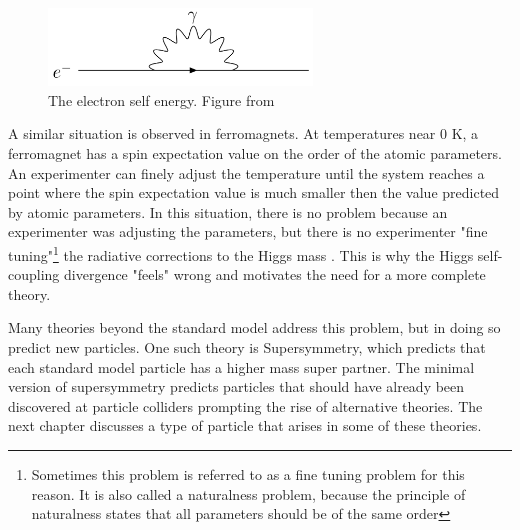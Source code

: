 \begin{figure}[htb]
    \centering
    \includegraphics[width=7cm]{electronSelfE.png}
    \caption{The electron self energy. Figure from \cite{SusyHiggsSelfE}}
    \label{electronSelfE}
\end{figure}

A similar situation is observed in ferromagnets. At temperatures near $0$ K, a ferromagnet has a spin expectation value on the order of the atomic parameters. An experimenter can finely adjust the temperature until the system reaches a point where the spin expectation value is much smaller then the value predicted by atomic parameters. In this situation, there is no problem because an experimenter was adjusting the parameters, but there is no experimenter "fine tuning"\footnote{Sometimes this problem is referred to as a fine tuning problem for this reason. It is also called a naturalness problem, because the principle of naturalness states that all parameters should be of the same order} the radiative corrections to the Higgs mass \cite{Peskin}. This is why the Higgs self-coupling divergence "feels" wrong and motivates the need for a more complete theory.

Many theories beyond the standard model address this problem, but in doing so predict new particles. One such theory is Supersymmetry, which predicts that each standard model particle has a higher mass super partner. The minimal version of supersymmetry predicts particles that should have already been discovered at particle colliders prompting the rise of alternative theories. The next chapter discusses a type of particle that arises in some of these theories.

